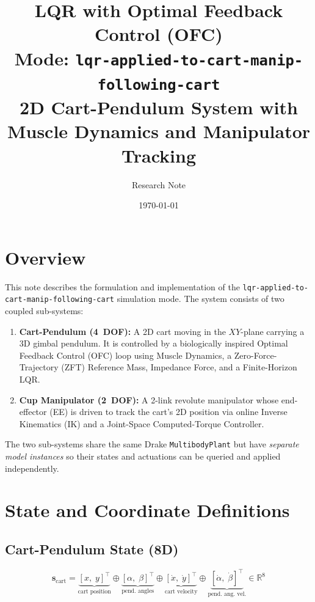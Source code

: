 \documentclass[11pt, a4paper]{article}
\title{%
  \textbf{LQR with Optimal Feedback Control (OFC)} \\[0.5em]
  \large Mode: \texttt{lqr-applied-to-cart-manip-following-cart} \\[0.2em]
  \normalsize 2D Cart-Pendulum System with Muscle Dynamics and Manipulator Tracking
}
\author{Research Note}
\date{\today}
\begin{document}
\maketitle
\tableofcontents
\newpage

\section{Overview}

This note describes the formulation and implementation of the
\texttt{lqr-applied-to-cart-manip-following-cart} simulation mode.
The system consists of two coupled sub-systems:

\begin{enumerate}
  \item \textbf{Cart-Pendulum (4~DOF):} A 2D cart moving in the $XY$-plane
        carrying a 3D gimbal pendulum. It is controlled by a biologically
        inspired Optimal Feedback Control (OFC) loop using Muscle Dynamics,
        a Zero-Force-Trajectory (ZFT) Reference Mass, Impedance Force, and a
        Finite-Horizon LQR.
  \item \textbf{Cup Manipulator (2~DOF):} A 2-link revolute manipulator whose
        end-effector (EE) is driven to track the cart's 2D position via online
        Inverse Kinematics (IK) and a Joint-Space Computed-Torque Controller.
\end{enumerate}

The two sub-systems share the same Drake \texttt{MultibodyPlant} but have
\emph{separate model instances} so their states and actuations can be queried
and applied independently.

\section{State and Coordinate Definitions}

\subsection{Cart-Pendulum State (8D)}

\[
\bm{s}_{\text{cart}} =
\underbrace{[x,\; y]^{\top}}_{\text{cart position}}
\oplus
\underbrace{[\alpha,\; \beta]^{\top}}_{\text{pend. angles}}
\oplus
\underbrace{[\dot{x},\; \dot{y}]^{\top}}_{\text{cart velocity}}
\oplus
\underbrace{[\dot{\alpha},\; \dot{\beta}]^{\top}}_{\text{pend. ang. vel.}}
\in \mathbb{R}^{8}
\]
\end{document}
